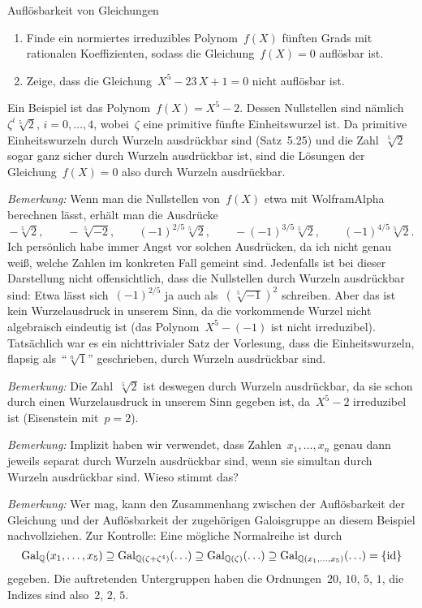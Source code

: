 \documentclass{algblatt}
\begin{document}
\begin{aufgabe}{Auflösbarkeit von Gleichungen}
\begin{enumerate}
\item Finde ein normiertes irreduzibles Polynom~$f(X)$ fünften Grads mit
rationalen Koeffizienten, sodass die Gleichung~$f(X) = 0$ auflösbar ist.
\item Zeige, dass die Gleichung~$X^5 - 23\,X + 1 = 0$ nicht auflösbar ist.
\end{enumerate}

\begin{loesungE}
\item Ein Beispiel ist das Polynom~$f(X) = X^5 - 2$. Dessen Nullstellen sind
nämlich~$\zeta^i \sqrt[5]{2}$, $i = 0,\ldots,4$, wobei~$\zeta$ eine primitive
fünfte Einheitswurzel ist. Da primitive Einheitswurzeln durch Wurzeln
ausdrückbar sind (Satz~5.25) und die Zahl~$\sqrt[5]{2}$ sogar ganz sicher durch
Wurzeln ausdrückbar ist, sind die Lösungen der Gleichung~$f(X) = 0$ also durch
Wurzeln ausdrückbar.

\emph{Bemerkung:} Wenn man die Nullstellen von~$f(X)$ etwa mit WolframAlpha
berechnen lässt, erhält man die Ausdrücke
\[ -\sqrt[5]{2}, \qquad
  -\sqrt[5]{-2}, \qquad
  (-1)^{2/5} \sqrt[5]{2}, \qquad
  -(-1)^{3/5} \sqrt[5]{2}, \qquad
  (-1)^{4/5} \sqrt[5]{2}. \]
Ich persönlich habe immer Angst vor solchen Ausdrücken, da ich nicht genau
weiß, welche Zahlen im konkreten Fall gemeint sind. Jedenfalls ist bei dieser
Darstellung nicht offensichtlich, dass die Nullstellen durch Wurzeln
ausdrückbar sind: Etwa lässt sich~$(-1)^{2/5}$ ja auch als~$(\sqrt[5]{-1})^2$
schreiben. Aber das ist kein Wurzelausdruck in unserem Sinn, da die vorkommende
Wurzel nicht algebraisch eindeutig ist (das Polynom~$X^5 - (-1)$ ist nicht
irreduzibel). Tatsächlich war es ein nichttrivialer Satz der Vorlesung, dass
die Einheitswurzeln, flapsig als~"`$\sqrt[n]{1}$"' geschrieben, durch Wurzeln
ausdrückbar sind.

\emph{Bemerkung:} Die Zahl~$\sqrt[5]{2}$ ist deswegen durch Wurzeln
ausdrückbar, da sie schon durch einen Wurzelausdruck in unserem Sinn gegeben
ist, da~$X^5 - 2$ irreduzibel ist (Eisenstein mit~$p = 2$).

\emph{Bemerkung:} Implizit haben wir verwendet, dass Zahlen~$x_1,\ldots,x_n$
genau dann jeweils separat durch Wurzeln ausdrückbar sind, wenn sie simultan
durch Wurzeln ausdrückbar sind. Wieso stimmt das?

\emph{Bemerkung:} Wer mag, kann den Zusammenhang zwischen der Auflösbarkeit der
Gleichung und der Auflösbarkeit der zugehörigen Galoisgruppe an diesem Beispiel
nachvollziehen. Zur Kontrolle: Eine mögliche Normalreihe ist durch
\[ \mathrm{Gal}_{\mathbb{Q}}(x_1,\ldots,x_5) \supseteq
  \mathrm{Gal}_{\mathbb{Q}(\zeta + \zeta^4)}(\ldots) \supseteq
  \mathrm{Gal}_{\mathbb{Q}(\zeta)}(\ldots) \supseteq
  \mathrm{Gal}_{\mathbb{Q}(x_1,\ldots,x_5)}(\ldots) = \{ \mathrm{id} \} \]
gegeben. Die auftretenden Untergruppen haben die Ordnungen~$20$, $10$, $5$,
$1$, die Indizes sind also~$2$, $2$, $5$.


\end{loesungE}
\end{aufgabe}
\end{document}
